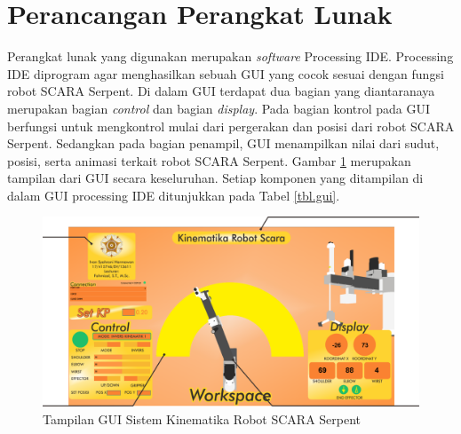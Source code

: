 \section{Perancangan Perangkat Lunak}
Perangkat lunak yang digunakan merupakan \textit{software} Processing IDE. Processing IDE diprogram agar menghasilkan sebuah GUI yang cocok sesuai dengan fungsi robot SCARA Serpent. Di dalam GUI terdapat dua bagian yang diantaranaya merupakan bagian \textit{control} dan bagian \textit{display}. Pada bagian kontrol pada GUI berfungsi untuk mengkontrol mulai dari pergerakan dan posisi dari robot SCARA Serpent. Sedangkan pada bagian penampil, GUI menampilkan nilai dari sudut, posisi, serta animasi terkait robot SCARA Serpent. Gambar \ref{pic.gui} merupakan tampilan dari GUI secara keseluruhan. Setiap komponen yang ditampilan di dalam GUI processing IDE ditunjukkan pada Tabel \ref{tbl.gui}.
\begin{figure}[H]
	\centering
	\includegraphics[width=12cm ]{gambar/GUI.png}
	\caption{Tampilan GUI Sistem Kinematika Robot SCARA Serpent}
	\label{pic.gui}
\end{figure}

